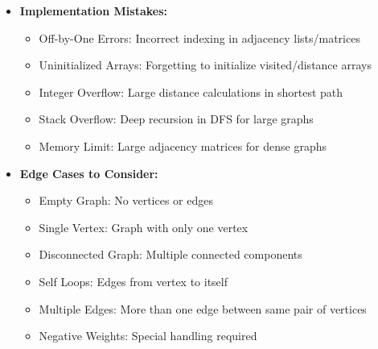 \documentclass[a4paper,10pt]{book}
\begin{document}
\begin{itemize}[leftmargin=*]
    \item \textbf{Implementation Mistakes:}
    \begin{itemize}
        \item Off-by-One Errors: Incorrect indexing in adjacency lists/matrices
        \item Uninitialized Arrays: Forgetting to initialize visited/distance arrays
        \item Integer Overflow: Large distance calculations in shortest path
        \item Stack Overflow: Deep recursion in DFS for large graphs
        \item Memory Limit: Large adjacency matrices for dense graphs
    \end{itemize}

    \item \textbf{Edge Cases to Consider:}
    \begin{itemize}
        \item Empty Graph: No vertices or edges
        \item Single Vertex: Graph with only one vertex
        \item Disconnected Graph: Multiple connected components
        \item Self Loops: Edges from vertex to itself
        \item Multiple Edges: More than one edge between same pair of vertices
        \item Negative Weights: Special handling required
    \end{itemize}
\end{itemize}
\end{document}
